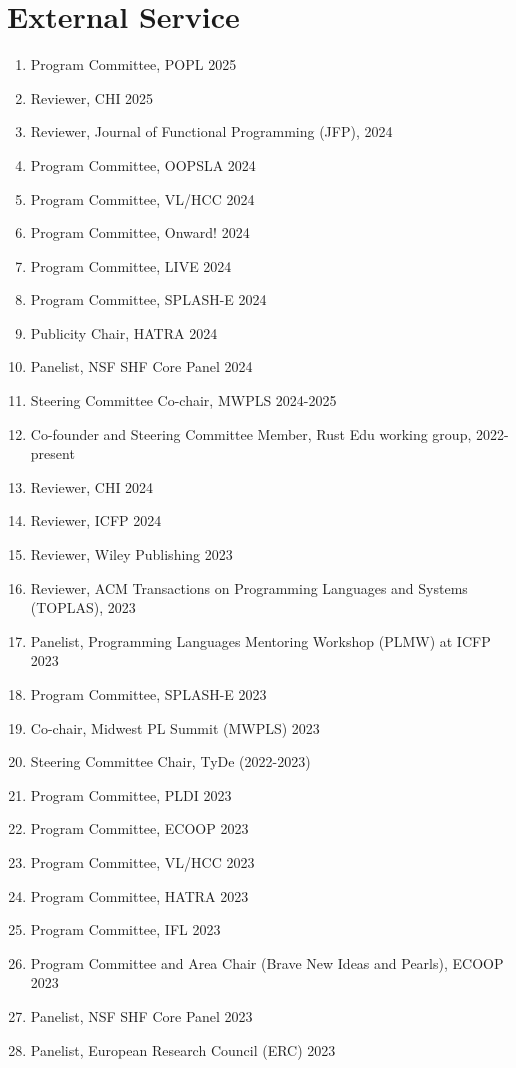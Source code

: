 \documentclass[10pt,letterpaper]{article}
\begin{document}
\section*{External Service}
\begin{enumerate}
  \item Program Committee, POPL 2025
  \item Reviewer, CHI 2025
  \item Reviewer, Journal of Functional Programming (JFP), 2024
  \item Program Committee, OOPSLA 2024
  \item Program Committee, VL/HCC 2024
  \item Program Committee, Onward! 2024
  \item Program Committee, LIVE 2024
  \item Program Committee, SPLASH-E 2024
  \item Publicity Chair, HATRA 2024
  \item Panelist, NSF SHF Core Panel 2024
  \item Steering Committee Co-chair, MWPLS 2024-2025
  \item Co-founder and Steering Committee Member, Rust Edu working group, 2022-present
  \item Reviewer, CHI 2024
  \item Reviewer, ICFP 2024
  \item Reviewer, Wiley Publishing 2023
  \item Reviewer, ACM Transactions on Programming Languages and Systems (TOPLAS), 2023
  \item Panelist, Programming Languages Mentoring Workshop (PLMW) at ICFP 2023
  \item Program Committee, SPLASH-E 2023
  \item Co-chair, Midwest PL Summit (MWPLS) 2023
  \item Steering Committee Chair, TyDe (2022-2023)
  \item Program Committee, PLDI 2023
  \item Program Committee, ECOOP 2023
  \item Program Committee, VL/HCC 2023
  \item Program Committee, HATRA 2023
  \item Program Committee, IFL 2023
  \item Program Committee and Area Chair (Brave New Ideas and Pearls), ECOOP 2023
  \item Panelist, NSF SHF Core Panel 2023
  \item Panelist, European Research Council (ERC) 2023

\end{enumerate}
\end{document}
